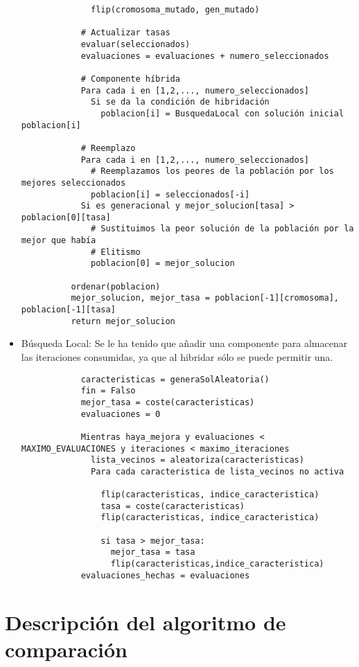 \documentclass[a4paper, 11pt]{article}
\begin{document}
\begin{itemize}
\begin{verbatim}
              flip(cromosoma_mutado, gen_mutado)

            # Actualizar tasas
            evaluar(seleccionados)
            evaluaciones = evaluaciones + numero_seleccionados

            # Componente híbrida
            Para cada i en [1,2,..., numero_seleccionados]
              Si se da la condición de hibridación
                poblacion[i] = BusquedaLocal con solución inicial poblacion[i]

            # Reemplazo
            Para cada i en [1,2,..., numero_seleccionados]
              # Reemplazamos los peores de la población por los mejores seleccionados
              poblacion[i] = seleccionados[-i]
            Si es generacional y mejor_solucion[tasa] > poblacion[0][tasa]
              # Sustituimos la peor solución de la población por la mejor que había
              # Elitismo
              poblacion[0] = mejor_solucion

          ordenar(poblacion)
          mejor_solucion, mejor_tasa = poblacion[-1][cromosoma], poblacion[-1][tasa]
          return mejor_solucion
        \end{verbatim}
        \item Búsqueda Local: Se le ha tenido que añadir una componente
        para almacenar las iteraciones consumidas, ya que al hibridar sólo se
        puede permitir una.
          \begin{verbatim}
            caracteristicas = generaSolAleatoria()
            fin = Falso
            mejor_tasa = coste(caracteristicas)
            evaluaciones = 0

            Mientras haya_mejora y evaluaciones < MAXIMO_EVALUACIONES y iteraciones < maximo_iteraciones
              lista_vecinos = aleatoriza(caracteristicas)
              Para cada caracteristica de lista_vecinos no activa

                flip(caracteristicas, indice_caracteristica)
                tasa = coste(caracteristicas)
                flip(caracteristicas, indice_caracteristica)

                si tasa > mejor_tasa:
                  mejor_tasa = tasa
                  flip(caracteristicas,indice_caracteristica)
            evaluaciones_hechas = evaluaciones
              \end{verbatim}
    \end{itemize}


  \section{Descripción del algoritmo de comparación}
    
\end{document}
